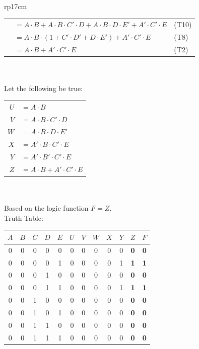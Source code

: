 \documentclass{article}
\begin{document}
\begin{longtable}[l]{rp{17cm}}
\begin{minipage}[t]{\linewidth}
\begin{tabular}{rll}
      & $=A \cdot B + A \cdot B \cdot C' \cdot D + A \cdot B \cdot D \cdot E' + A' \cdot C' \cdot E$ & (T10)\\
      & $=A \cdot B \cdot (1 + C' \cdot D' + D \cdot E') + A' \cdot C' \cdot E$ & (T8)\\
      & $=A \cdot B + A' \cdot C' \cdot E$ & (T2)\\
\end{tabular}\\ \\
Let the following be true:\\
\begin{tabular}{rl}
  $U$ & $= A \cdot B$\\
  $V$ & $= A \cdot B \cdot C' \cdot D$\\
  $W$ & $= A \cdot B \cdot D \cdot E'$\\
  $X$ & $= A' \cdot B \cdot C' \cdot E$\\
  $Y$ & $= A' \cdot B' \cdot C' \cdot E$\\
  $Z$ & $= A \cdot B + A' \cdot C' \cdot E$\\
\end{tabular}\\ \\
Based on the logic function $F=Z$.\\
Truth Table:\\
\begin{tabular}{ccccc|ccccc|cc}
  $A$ & $B$ & $C$ & $D$ & $E$ & $U$ & $V$ & $W$ & $X$ & $Y$ & \textbf{$Z$} & \textbf{$F$}\\
  \hline
   0  &  0  &  0  &  0  &  0  &  0  &  0  &  0  &  0  &  0  & \textbf{ 0 } & \textbf{ 0 }\\
   0  &  0  &  0  &  0  &  1  &  0  &  0  &  0  &  0  &  1  & \textbf{ 1 } & \textbf{ 1 }\\
   0  &  0  &  0  &  1  &  0  &  0  &  0  &  0  &  0  &  0  & \textbf{ 0 } & \textbf{ 0 }\\
   0  &  0  &  0  &  1  &  1  &  0  &  0  &  0  &  0  &  1  & \textbf{ 1 } & \textbf{ 1 }\\
   0  &  0  &  1  &  0  &  0  &  0  &  0  &  0  &  0  &  0  & \textbf{ 0 } & \textbf{ 0 }\\
   0  &  0  &  1  &  0  &  1  &  0  &  0  &  0  &  0  &  0  & \textbf{ 0 } & \textbf{ 0 }\\
   0  &  0  &  1  &  1  &  0  &  0  &  0  &  0  &  0  &  0  & \textbf{ 0 } & \textbf{ 0 }\\
   0  &  0  &  1  &  1  &  1  &  0  &  0  &  0  &  0  &  0  & \textbf{ 0 } & \textbf{ 0 }\\

\end{tabular}
\end{minipage}
\end{longtable}
\end{document}
